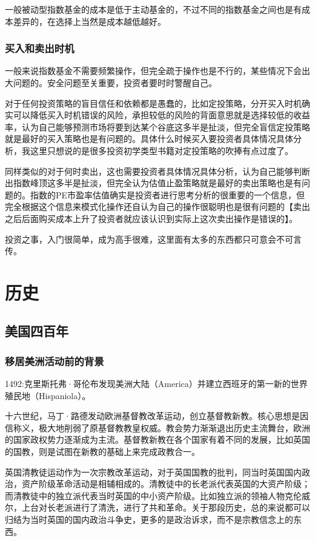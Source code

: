 \documentclass[12pt,oneside]{book}
\begin{document}
一般被动型指数基金的成本是低于主动基金的，不过不同的指数基金之间也是有成本差异的，在选择上当然是成本越低越好。




\section{买入和卖出时机}
一般来说指数基金不需要频繁操作，但完全疏于操作也是不行的，某些情况下会出大问题的。安全问题至关重要，投资者要时时警醒自己。

对于任何投资策略的盲目信任和依赖都是愚蠢的，比如定投策略，分开买入时机确实可以降低买入时机错误的风险，承担较低的风险的背面意思就是选择较低的收益率，认为自己能够预测市场将要到达某个谷底这多半是扯淡，但完全盲信定投策略就是最好的买入策略也是有问题的。具体什么时候买入要投资者具体情况具体分析，我这里只想说的是很多投资初学类型书籍对定投策略的吹捧有点过度了。

同样类似的对于何时卖出，这也需要投资者具体情况具体分析，认为自己能够判断出指数峰顶这多半是扯淡，但完全认为估值止盈策略就是最好的卖出策略也是有问题的。指数的PE市盈率估值确实是投资者进行思考分析的很重要的一个信息，但完全根据这个信息来模式化操作还自认为自己的操作很聪明也是很有问题的【卖出之后后面购买成本上升了投资者就应该认识到实际上这次卖出操作是错误的】。

投资之事，入门很简单，成为高手很难，这里面有太多的东西都只可意会不可言传。



\part{历史}


\chapter{美国四百年}
\section{移居美洲活动前的背景}
1492:克里斯托弗·哥伦布发现美洲大陆（America）并建立西班牙的第一新的世界殖民地（Hispaniola）。

十六世纪，马丁·路德发动欧洲基督教改革运动，创立基督教新教。核心思想是因信称义，极大地削弱了原基督教教皇权威。教会势力渐渐退出历史主流舞台，欧洲的国家政权势力逐渐成为主流。基督教新教在各个国家有着不同的发展，比如英国的国教，则是试图在新教的基础上来完成政教合一。

英国清教徒运动作为一次宗教改革运动，对于英国国教的批判，同当时英国国内政治，资产阶级革命活动是相辅相成的。清教徒中的长老派代表英国的大资产阶级；而清教徒中的独立派代表当时英国的中小资产阶级。比如独立派的领袖人物克伦威尔，上台对长老派进行了清洗，进行了共和革命。关于那段历史，总的来说都可以归结为当时英国的国内政治斗争史，更多的是政治诉求，而不是宗教信念上的东西。
\end{document}
